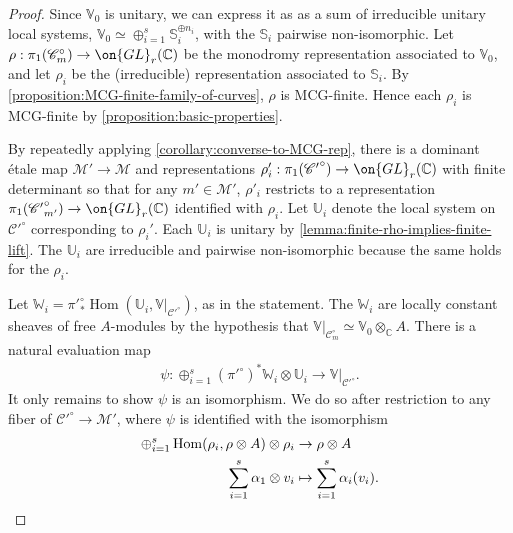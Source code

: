\documentclass[12 pt]{amsart}
\theoremstyle{plain}
\theoremstyle{definition}
\theoremstyle{remark}
\numberwithin{equation}{section}
\DeclareMathOperator\Hom{Hom}
\begin{document}
\begin{proof}
Since $\mathbb V_0$ is unitary, we can express it as
as a sum of irreducible unitary local systems, 
$\mathbb V_0 \simeq \oplus_{i=1}^s \mathbb
S_i^{\oplus n_i}$, with the $\mathbb{S}_i$ pairwise non-isomorphic.
Let $\rho:\pi_1(\mathscr C_m^\circ) \to \on{GL}_r(\mathbb C)$ be the monodromy representation associated to $\mathbb{V}_0$, and let
$\rho_i$ be the (irreducible) representation associated to $\mathbb{S}_i$.
By \autoref{proposition:MCG-finite-family-of-curves}, $\rho$ is MCG-finite. Hence each
$\rho_i$ is MCG-finite by \autoref{proposition:basic-properties}.

By repeatedly applying \autoref{corollary:converse-to-MCG-rep},
there is a dominant \'etale map $\mathscr M' \to \mathscr M$ and representations
$\rho'_i: \pi_1({\mathscr {C}'}^\circ) \to \on{GL}_r(\mathbb C)$ with finite determinant so that for any $m' \in \mathscr
M'$, $\rho'_i$ restricts to a representation
$\pi_1({\mathscr{C}'}^\circ_{m'}) \to \on{GL}_r(\mathbb C)$
identified with $\rho_i$.
Let $\mathbb U_i$ denote the local system on ${\mathscr{C}'}^\circ$ corresponding to
$\rho_i'$.
Each $\mathbb U_i$ is unitary by \autoref{lemma:finite-rho-implies-finite-lift}.
The $\mathbb{U}_i$ 
are irreducible and pairwise non-isomorphic
because the same holds for the $\rho_i$.

Let $\mathbb W_i = \pi'^\circ_*\Hom(\mathbb U_i, \mathbb V|_{\mathscr
C'^\circ})$, as in the statement. The $\mathbb{W}_i$ are locally constant sheaves of free $A$-modules by the hypothesis that $\mathbb V|_{\mathscr C^\circ_m}\simeq \mathbb{V}_0\otimes_\mathbb{C} A$. There is a natural evaluation map
\begin{align*}
	\psi: \oplus_{i=1}^s (\pi'^\circ)^* \mathbb W_i \otimes \mathbb U_i \to \mathbb
	V|_{{\mathscr{C}'}^\circ}.
\end{align*}
It only remains to show $\psi$ is an isomorphism.
We do so after restriction to any fiber
of $\mathscr C'^\circ \to \mathscr M'$, where $\psi$ is identified with the
isomorphism
\begin{align}
	\nonumber
	\oplus_{i=1}^s \Hom(\rho_i, \rho\otimes A) \otimes \rho_i  & \rightarrow \rho\otimes A\\
	\sum_{i=1}^s \alpha_1 \otimes v_i & \mapsto \sum_{i=1}^s \alpha_i(v_i).
	\qedhere
\end{align}
\end{proof}
\end{document}
